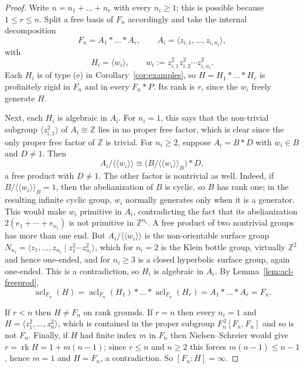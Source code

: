 \documentclass[11pt]{amsart}
\theoremstyle{plain}
\theoremstyle{definition}
\newcommand{\acl}{\operatorname{acl}}
\newcommand{\rk}{\operatorname{rk}}
\begin{document}
\begin{proof}
Write $n=n_1+\dots+n_r$ with every $n_i\ge1$; this is possible because
$1\le r\le n$.  Split a free basis of $F_n$ accordingly and take the internal
decomposition
\[
  F_n=A_1*\dots*A_r,\qquad
  A_i=\langle z_{i,1},\dots,z_{i,n_i}\rangle,
\]
with
\[
  H_i=\bigl\langle w_i\bigr\rangle,\qquad
  w_i:=z_{i,1}^{2}z_{i,2}^{2}\cdots z_{i,n_i}^{2}.
\]
Each $H_i$ is of type (e) in Corollary~\ref{cor:examples}, so
$H=H_1*\dots*H_r$ is profinitely rigid in $F_n$ and in every $F_n*P$.  Its rank
is $r$, since the $w_i$ freely generate $H$.

Next, each $H_i$ is algebraic in $A_i$.  For $n_i=1$, this says that the
non-trivial subgroup $\langle z_{i,1}^{2}\rangle$ of $A_i\cong\mathbb Z$ lies in
no proper free factor, which is clear since the only proper free factor of
$\mathbb Z$ is trivial.  For $n_i\ge2$, suppose $A_i=B*D$ with $w_i\in B$ and
$D\neq1$.  Then
\[
  A_i/\langle\langle w_i\rangle\rangle
  \cong\bigl(B/\langle\langle w_i\rangle\rangle_B\bigr)*D,
\]
a free product with $D\neq1$.  The other factor is nontrivial as well.  Indeed,
if $B/\langle\langle w_i\rangle\rangle_B=1$, then the abelianization of $B$ is
cyclic, so $B$ has rank one; in the resulting infinite cyclic group, $w_i$
normally generates only when it is a generator.  This would make $w_i$
primitive in $A_i$, contradicting the fact that its abelianization
$2(e_1+\cdots+e_{n_i})$ is not primitive in $\mathbb Z^{n_i}$.  A free product
of two nontrivial groups has more than one end.  But
$A_i/\langle\langle w_i\rangle\rangle$ is the non-orientable surface group
$N_{n_i}=\langle z_1,\dots,z_{n_i}\mid z_1^{2}\cdots z_{n_i}^{2}\rangle$, which
for $n_i=2$ is the Klein bottle group, virtually $\mathbb Z^{2}$ and hence
one-ended, and for $n_i\ge3$ is a closed hyperbolic surface group, again
one-ended.  This is a contradiction, so $H_i$ is algebraic in $A_i$.  By
Lemma~\ref{lem:acl-freeprod},
\[
  \acl_{F_n}(H)=\acl_{F_n}(H_1)*\dots*\acl_{F_n}(H_r)=A_1*\dots*A_r=F_n .
\]

If $r<n$ then $H\neq F_n$ on rank grounds.  If $r=n$ then every $n_i=1$ and
$H=\langle z_1^{2},\dots,z_n^{2}\rangle$, which is contained in the proper
subgroup $F_n^{\,2}[F_n,F_n]$ and so is not $F_n$.  Finally, if $H$ had finite
index $m$ in $F_n$ then Nielsen--Schreier would give $r=\rk H=1+m(n-1)$; since
$r\le n$ and $n\ge2$ this forces $m(n-1)\le n-1$, hence $m=1$ and $H=F_n$, a
contradiction.  So $[F_n:H]=\infty$.
\end{proof}
\end{document}
